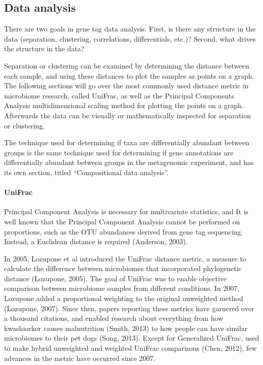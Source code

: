 \subsection{Data analysis}
There are two goals in gene tag data analysis. First, is there any structure in the data (separation, clustering, correlations, differentials, etc.)? Second, what drives the structure in the data?

Separation or clustering can be examined by determining the distance between each sample, and using these distances to plot the samples as points on a graph. The following sections will go over the most commonly used distance metric in microbiome research, called UniFrac, as well as the Principal Components Analysis multidimensional scaling method for plotting the points on a graph. Afterwards the data can be visually or mathematically inspected for separation or clustering.

The technique used for determining if taxa are differentially abundant between groups is the same technique used for determining if gene annotations are differentially abundant between groups in the metagenomic experiment, and has its own section, titled “Compositional data analysis”.

\paragraph{UniFrac}
Principal Component Analysis is necessary for multivariate statistics, and It is well known that the Principal Component Analysis cannot be performed on proportions, such as the OTU abundances derived from gene tag sequencing. Instead, a Euclidean distance is required (Anderson, 2003).

In 2005, Lozupone et al introduced the UniFrac distance metric, a measure to calculate the difference between microbiomes that incorporated phylogenetic distance (Lozupone, 2005). The goal of UniFrac was to enable objective comparison between microbiome samples from different conditions. In 2007, Lozupone added a proportional weighting to the original unweighted method (Lozupone, 2007). Since then, papers reporting these metrics have garnered over a thousand citations, and enabled research about everything from how kwashiorkor causes malnutrition (Smith, 2013) to how people can have similar microbiomes to their pet dogs (Song, 2013).  Except for Generalized UniFrac, used to make hybrid unweighted and weighted UniFrac comparisons (Chen, 2012), few advances in the metric have occurred since 2007. 

